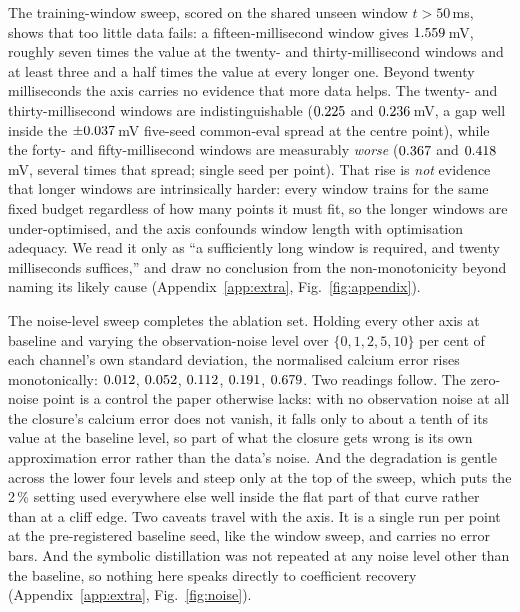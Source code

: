 \documentclass{article}
\newcommand{\Tcommon}{50}      %
\newcommand{\NoisePct}{2}      %
\begin{document}
The training-window sweep, scored on the shared unseen window
$t>\Tcommon$\,ms, shows that too little data fails: a fifteen-millisecond window
gives $1.559$\,mV, roughly seven times the value at
the twenty- and thirty-millisecond windows and at least three and a half times
the value at every longer one. Beyond twenty milliseconds the
axis carries no evidence that more data helps. The twenty- and thirty-millisecond
windows are indistinguishable ($0.225$ and
$0.236$\,mV, a gap well inside the
$\pm0.037$\,mV five-seed common-eval spread at the centre point), while the
forty- and fifty-millisecond windows are measurably \emph{worse}
($0.367$ and $0.418$\,mV,
several times that spread; single seed per point). That rise is \emph{not}
evidence that longer windows are intrinsically harder: every window trains for
the same fixed budget regardless of how many points it must fit, so the longer
windows are under-optimised, and the axis confounds window length with
optimisation adequacy. We read it only as ``a sufficiently long window is
required, and twenty milliseconds suffices,'' and draw no conclusion from the
non-monotonicity beyond naming its likely cause
(Appendix~\ref{app:extra}, Fig.~\ref{fig:appendix}).

The noise-level sweep completes the ablation set. Holding every other axis at
baseline and varying the observation-noise level over $\{0, 1, 2, 5, 10\}$ per cent of %
each channel's own standard deviation, the normalised calcium error rises
monotonically: $0.012$, $0.052$,
$0.112$, $0.191$,
$0.679$. Two readings follow. The zero-noise point is a
control the paper otherwise lacks: with no observation noise at all the closure's
calcium error does not vanish, it falls only to about a tenth of its value at the
baseline level, so part of what the closure gets wrong is its own approximation
error rather than the data's noise. And the degradation is gentle across the
lower four levels and steep only at the top of the sweep, which puts the
\NoisePct\,\% setting used everywhere else well inside the flat part of that
curve rather than at a cliff edge.
Two caveats travel with the axis. It is a single run per point at the
pre-registered baseline seed, like the window sweep, and carries no error bars.
And the symbolic distillation was not repeated at any noise level other than the
baseline, so nothing here speaks directly to coefficient recovery
(Appendix~\ref{app:extra}, Fig.~\ref{fig:noise}).
\end{document}
